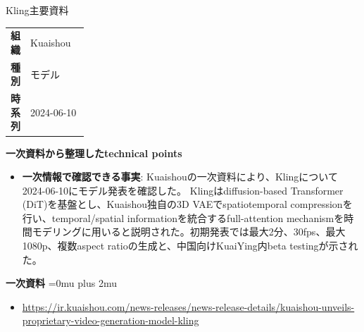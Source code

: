 \Needspace{0.38\textheight}
\begin{technicalnote}{Kling}{主要資料}
\begingroup
\begin{tabularx}{\linewidth}{@{}>{\bfseries}p{0.22\linewidth}X@{}}
組織 & Kuaishou \\
種別 & モデル \\
時系列 & 2024-06-10 \\
\end{tabularx}
\smallskip
\begin{minipage}{\linewidth}
{\bfseries 一次資料から整理したtechnical points}
\begin{itemize}[leftmargin=1.5em,itemsep=0.35em]
\item \textbf{一次情報で確認できる事実}: Kuaishouの一次資料により、Klingについて2024-06-10にモデル発表を確認した。 Klingはdiffusion-based Transformer (DiT)を基盤とし、Kuaishou独自の3D VAEでspatiotemporal compressionを行い、temporal/spatial informationを統合するfull-attention mechanismを時間モデリングに用いると説明された。初期発表では最大2分、30fps、最大1080p、複数aspect ratioの生成と、中国向けKuaiYing内beta testingが示された。
\end{itemize}
\begin{minipage}{\linewidth}
\begin{samepage}
{\bfseries 一次資料}
\begingroup\sloppy
\Urlmuskip=0mu plus 2mu\relax
\begin{itemize}[leftmargin=1.5em,itemsep=0.25em]
\item {\scriptsize\url{https://ir.kuaishou.com/news-releases/news-release-details/kuaishou-unveils-proprietary-video-generation-model-kling}}
\end{itemize}
\endgroup
\end{samepage}
\end{minipage}
\end{minipage}
\endgroup
\end{technicalnote}
\medskip

